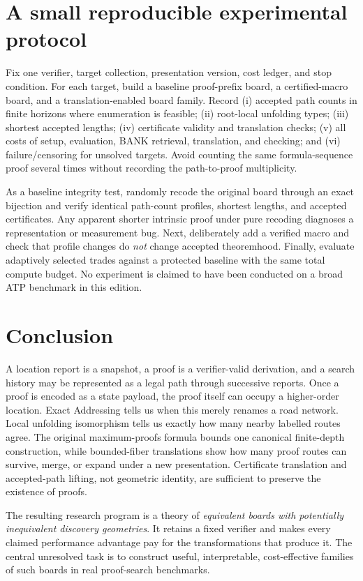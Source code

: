 \documentclass[11pt,letterpaper]{article}
\theoremstyle{definition}
\begin{document}
\section{A small reproducible experimental protocol}
Fix one verifier, target collection, presentation version, cost ledger, and stop condition. For each target, build a baseline proof-prefix board, a certified-macro board, and a translation-enabled board family. Record (i) accepted path counts in finite horizons where enumeration is feasible; (ii) root-local unfolding types; (iii) shortest accepted lengths; (iv) certificate validity and translation checks; (v) all costs of setup, evaluation, BANK retrieval, translation, and checking; and (vi) failure/censoring for unsolved targets. Avoid counting the same formula-sequence proof several times without recording the path-to-proof multiplicity.

As a baseline integrity test, randomly recode the original board through an exact bijection and verify identical path-count profiles, shortest lengths, and accepted certificates. Any apparent shorter intrinsic proof under pure recoding diagnoses a representation or measurement bug. Next, deliberately add a verified macro and check that profile changes do \emph{not} change accepted theoremhood. Finally, evaluate adaptively selected trades against a protected baseline with the same total compute budget. No experiment is claimed to have been conducted on a broad ATP benchmark in this edition.

\section{Conclusion}
A location report is a snapshot, a proof is a verifier-valid derivation, and a search history may be represented as a legal path through successive reports. Once a proof is encoded as a state payload, the proof itself can occupy a higher-order location. Exact Addressing tells us when this merely renames a road network. Local unfolding isomorphism tells us exactly how many nearby labelled routes agree. The original maximum-proofs formula bounds one canonical finite-depth construction, while bounded-fiber translations show how many proof routes can survive, merge, or expand under a new presentation. Certificate translation and accepted-path lifting, not geometric identity, are sufficient to preserve the existence of proofs.

The resulting research program is a theory of \emph{equivalent boards with potentially inequivalent discovery geometries}. It retains a fixed verifier and makes every claimed performance advantage pay for the transformations that produce it. The central unresolved task is to construct useful, interpretable, cost-effective families of such boards in real proof-search benchmarks.
\end{document}

